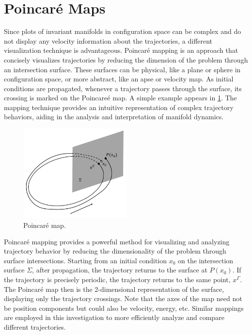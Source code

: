 \section{Poincar\'e Maps}
Since plots of invariant manifolds in configuration space can be complex and do not display any
velocity information about the trajectories, a different visualization technique is advantageous.
Poincar\'e mapping is an approach that concisely visualizes trajectories by reducing the dimension
of the problem through an intersection surface. These surfaces can be physical, like a plane or
sphere in configuration space, or more abstract, like an apse or velocity map. As initial
conditions are propagated, whenever a trajectory passes through the surface, its crossing is
marked on the Poincare\'e map. A simple example appears in \cref{fig:map}. The mapping technique
provides an intuitive representation of complex trajectory behaviors, aiding in the analysis and
interpretation of manifold dynamics.

\begin{figure}[H]
    \centering
    \includegraphics[width=0.5\textwidth]{figures/Map.jpg}
    \caption{Poincar\'e map.}
    \label{fig:map}
\end{figure}

Poincaré mapping provides a powerful method for visualizing and analyzing trajectory behavior by
reducing the dimensionality of the problem through surface intersections. Starting from an initial
condition $x_{0}$ on the intersection surface $\Sigma$, after propagation, the trajectory returns
to the surface at $P(x_{0})$. If the trajectory is precisely periodic, the trajectory returns to
the same point, $x^{\Gamma}$. The Poincar\'e map then is the 2-dimensional representation of the
surface, displaying only the trajectory crossings. Note that the axes of the map need not be
position components but could also be velocity, energy, etc. Similar mappings are employed in this
investigation to more efficiently analyze and compare different trajectories.

